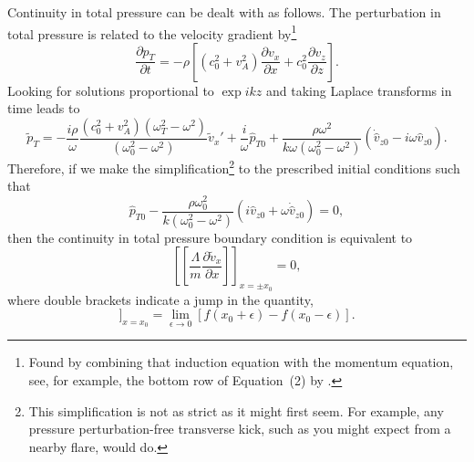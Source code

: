 Continuity in total pressure can be dealt with as follows. The perturbation in total pressure is related to the velocity gradient by\footnote{Found by combining that induction equation with the momentum equation, see, for example, the bottom row of Equation~(2) by \cite{and_etal07}.}
\begin{equation}
\frac{\partial p_T}{\partial t} = -\rho\left[ \left(c_0^2 + v_A^2\right) \frac{\partial v_x}{\partial x} + c_0^2\frac{\partial v_z}{\partial z} \right].
\end{equation}
Looking for solutions proportional to $\exp{ikz}$ and taking Laplace transforms in time leads to
\begin{equation}
\tilde{p}_T = -\frac{i\rho}{\omega} \frac{(c_0^2 + v_A^2)(\omega_T^2 - \omega^2)}{(\omega_0^2 - \omega^2)} \tilde{v}_x' + \frac{i}{\omega} \widehat{p}_{T0} + \frac{\rho \omega^2}{k\omega(\omega_0^2 - \omega^2)} \left(\dot{\widehat{v}}_{z0} - i\omega\widehat{v}_{z0}\right).
\end{equation}
Therefore, if we make the simplification\footnote{This simplification is not as strict as it might first seem. For example, any pressure perturbation-free transverse kick, such as you might expect from a nearby flare, would do.} to the prescribed initial conditions such that
\begin{equation}
\widehat{p}_{T0} - \frac{\rho \omega_0^2}{k(\omega_0^2 - \omega^2)} \left(i\widehat{v}_{z0} + \omega\dot{\widehat{v}}_{z0}\right) = 0,
\end{equation}
then the continuity in total pressure boundary condition is equivalent to
\begin{equation}
\left[ \left[ \frac{\Lambda}{m} \frac{\partial \tilde{v}_x}{\partial x} \right] \right]_{x=\pm x_0} = 0,
\end{equation}
where double brackets indicate a jump in the quantity,
\begin{equation}
[[f]]_{x=x_0} = \lim_{\epsilon \to 0} [f(x_0 + \epsilon) - f(x_0 - \epsilon)].
\end{equation}

